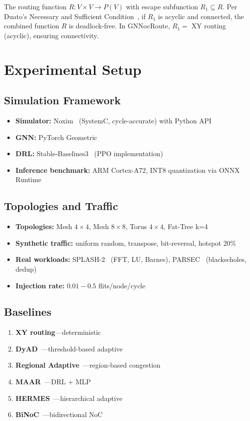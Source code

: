 \documentclass[conference]{IEEEtran}
\begin{document}
The routing function $R: V\times V\to P(V)$ with escape subfunction $R_1\subseteq R$. Per Duato's Necessary and Sufficient Condition~\cite{duato1996}, if $R_1$ is acyclic and connected, the combined function $R$ is deadlock-free. In GNNocRoute, $R_1 =$ XY routing (acyclic), ensuring connectivity.

\section{Experimental Setup}
\label{sec:experiment}

\subsection{Simulation Framework}
\begin{itemize}
 \item \textbf{Simulator:} Noxim~\cite{noxim2016} (SystemC, cycle-accurate) with Python API
 \item \textbf{GNN:} PyTorch Geometric~\cite{pyg2019}
 \item \textbf{DRL:} Stable-Baselines3~\cite{sb3} (PPO implementation)
 \item \textbf{Inference benchmark:} ARM Cortex-A72, INT8 quantization via ONNX Runtime
\end{itemize}

\subsection{Topologies and Traffic}
\begin{itemize}
 \item \textbf{Topologies:} Mesh $4\times4$, Mesh $8\times8$, Torus $4\times4$, Fat-Tree k=4
 \item \textbf{Synthetic traffic:} uniform random, transpose, bit-reversal, hotspot 20\%
 \item \textbf{Real workloads:} SPLASH-2~\cite{splash2} (FFT, LU, Barnes), PARSEC~\cite{parsec} (blackscholes, dedup)
 \item \textbf{Injection rate:} $0.01{-}0.5$ flits/node/cycle
\end{itemize}

\subsection{Baselines}
\begin{enumerate}
 \item \textbf{XY routing}---deterministic
 \item \textbf{DyAD}~\cite{dyad2004}---threshold-based adaptive
 \item \textbf{Regional Adaptive}~\cite{ebrahimi2019}---region-based congestion
 \item \textbf{MAAR}~\cite{wang2022maar}---DRL + MLP
 \item \textbf{HERMES}~\cite{hermes2023}---hierarchical adaptive
 \item \textbf{BiNoC}~\cite{binoc2024}---bidirectional NoC
\end{enumerate}
\end{document}
